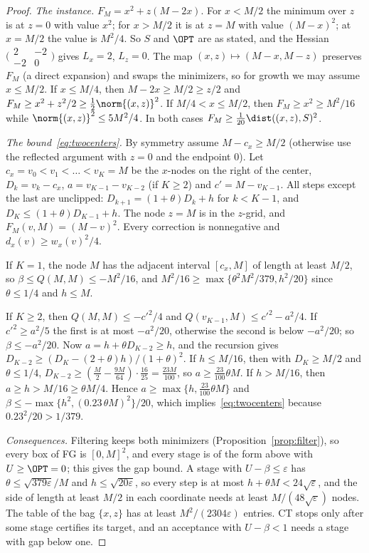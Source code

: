 \begin{proof}
\emph{The instance.} $F_M=x^2+z(M-2x)$. For $x<M/2$ the minimum over $z$ is
at $z=0$ with value $x^2$; for $x>M/2$ it is at $z=M$ with value $(M-x)^2$;
at $x=M/2$ the value is $M^2/4$. So $S$ and $\OPT$ are as stated, and the
Hessian $\bigl(\begin{smallmatrix}2&-2\\-2&0\end{smallmatrix}\bigr)$ gives
$L_x=2$, $L_z=0$. The map $(x,z)\mapsto(M-x,M-z)$ preserves $F_M$ (a direct
expansion) and swaps the minimizers, so for growth we may assume
$x\le M/2$. If $x\le M/4$, then $M-2x\ge M/2\ge z/2$ and
$F_M\ge x^2+z^2/2\ge\frac12\norm{(x,z)}^2$. If $M/4<x\le M/2$, then
$F_M\ge x^2\ge M^2/16$ while $\norm{(x,z)}^2\le5M^2/4$. In both cases
$F_M\ge\frac1{20}\dist((x,z),S)^2$.

\emph{The bound~\eqref{eq:twocenters}.} By symmetry assume $M-c_x\ge M/2$
(otherwise use the reflected argument with $z=0$ and the endpoint $0$). Let
$c_x=v_0<v_1<\dots<v_K=M$ be the $x$-nodes on the right of the center,
$D_k=v_k-c_x$, $a=v_{K-1}-v_{K-2}$ (if $K\ge2$) and $c'=M-v_{K-1}$. All steps
except the last are unclipped: $D_{k+1}=(1+\theta)D_k+h$ for $k<K-1$, and
$D_K\le(1+\theta)D_{K-1}+h$. The node $z=M$ is in the $z$-grid, and
$F_M(v,M)=(M-v)^2$. Every correction is nonnegative and
$d_x(v)\ge w_x(v)^2/4$.

If $K=1$, the node $M$ has the adjacent interval $[c_x,M]$ of length at least
$M/2$, so $\beta\le Q(M,M)\le-M^2/16$, and
$M^2/16\ge\max\{\theta^2M^2/379,h^2/20\}$ since $\theta\le1/4$ and $h\le M$.

If $K\ge2$, then $Q(M,M)\le-c'^2/4$ and
$Q(v_{K-1},M)\le c'^2-a^2/4$. If $c'^2\ge a^2/5$ the first is at most
$-a^2/20$, otherwise the second is below $-a^2/20$; so $\beta\le-a^2/20$.
Now $a=h+\theta D_{K-2}\ge h$, and the recursion gives
$D_{K-2}\ge(D_K-(2+\theta)h)/(1+\theta)^2$. If $h\le M/16$, then with
$D_K\ge M/2$ and $\theta\le1/4$,
$D_{K-2}\ge(\frac M2-\frac{9M}{64})\cdot\frac{16}{25}=\frac{23M}{100}$, so
$a\ge\frac{23}{100}\theta M$. If $h>M/16$, then $a\ge h>M/16\ge\theta M/4$.
Hence $a\ge\max\{h,\frac{23}{100}\theta M\}$ and
$\beta\le-\max\{h^2,(0.23\,\theta M)^2\}/20$, which
implies~\eqref{eq:twocenters} because $0.23^2/20>1/379$.

\emph{Consequences.} Filtering keeps both minimizers
(Proposition~\ref{prop:filter}), so every box of FG is $[0,M]^2$, and every
stage is of the form above with $U\ge\OPT=0$; this gives the gap bound. A
stage with $U-\beta\le\varepsilon$ has $\theta\le\sqrt{379\varepsilon}/M$
and $h\le\sqrt{20\varepsilon}$, so every step is at most
$h+\theta M<24\sqrt\varepsilon$, and the side of length at least $M/2$ in each
coordinate needs at least $M/(48\sqrt\varepsilon)$ nodes. The table of the
bag $\{x,z\}$ has at least $M^2/(2304\varepsilon)$ entries. CT stops only
after some stage certifies its target, and an acceptance with
$U-\beta<1$ needs a stage with gap below one.
\end{proof}

